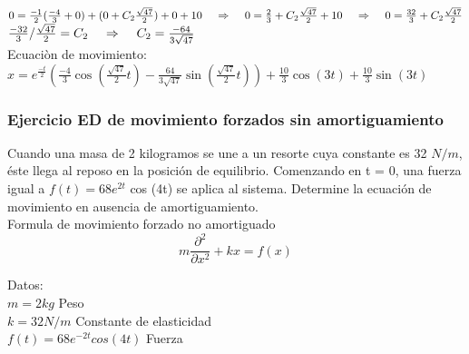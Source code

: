 \documentclass[12pt,a4paper]{article}
\begin{document}
$0={\frac{-1}{2} }(\frac{-4}{3}+0)+(0+C_{2}\frac{\sqrt{47}}{2})+0+10\hspace{0.4cm}\Rightarrow\hspace{0.4cm} 0={\frac{2}{3} }+C_{2}\frac{\sqrt{47}}{2}+10 \hspace{0.4cm}\Rightarrow\hspace{0.4cm} 0={\frac{32}{3} }+C_{2}\frac{\sqrt{47}}{2}$\\

${\frac{-32}{3} }/\frac{\sqrt{47}}{2}=C_{2} \hspace{0.4cm}\Rightarrow\hspace{0.4cm} C_{2}=\frac{-64}{3\sqrt{47}}$\\

Ecuaciòn de movimiento:\vspace{0.5cm} $x=e^{\frac{-t}{2} }(\frac{-4}{3}\cos(\frac{\sqrt{47}}{2} t)-\frac{64}{3\sqrt{47}}\sin(\frac{\sqrt{47}}{2} t))+\frac{10}{3}\cos(3t)+\frac{10}{3}\sin(3t)$

\subsubsection{Ejercicio ED de movimiento forzados sin amortiguamiento}
	
Cuando una masa de 2 kilogramos se une a un resorte cuya 
constante es 32 $N/m$, éste llega al reposo en la posición de 
equilibrio. Comenzando en t = 0, una fuerza igual a $f(t) =
68e^{2t}$
 cos (4t) se aplica al sistema. Determine la ecuación de 
movimiento en ausencia de amortiguamiento.\cite{05}\\

Formula de movimiento forzado no amortiguado\\ 
\begin{equation*}
m\frac{\partial^2 }{\partial x^2}+kx=f(x)
\end{equation*}

Datos:\\

\vspace{0.2cm}
$m=2 kg$\hspace{0.5cm} Peso\\

\vspace{0.2cm}
$k=32 N/m$\hspace{0.5cm} Constante de elasticidad\\

\vspace{0.2cm}
$f(t)=68e^{-2t}cos (4t)$\hspace{0.5cm} Fuerza\\
\end{document}
